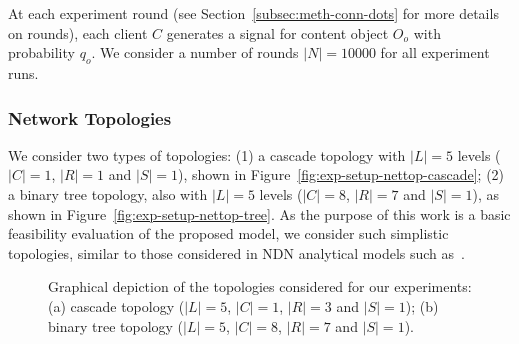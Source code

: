 At each experiment round (see Section~\ref{subsec:meth-conn-dots} for more details on 
rounds), each client $C$ generates a signal for content object $O_o$ with 
probability $q_{o}$. We consider a number of rounds 
$|N| = 10000$ for all experiment runs.\shortvertbreak

\subsubsection{Network Topologies}
\label{subsec:exp-setup-nettop}

We consider two types of topologies: (1) a cascade topology with $|L| = 5$ levels 
($|C| = 1$, $|R| = 1$ and $|S| = 1$), shown in Figure~\ref{fig:exp-setup-nettop-cascade}; (2) a binary 
tree topology, also with $|L| = 5$ levels ($|C| = 8$, $|R| = 7$ and $|S| = 1$), as 
shown in Figure~\ref{fig:exp-setup-nettop-tree}. As the purpose of this work is 
a basic feasibility evaluation of the proposed model, we consider such 
simplistic topologies, similar to those considered in NDN analytical models 
such as~\cite{6038471,Psaras:2011:MEC:2008780.2008789,Psaras2012,Chai2013}.\shortvertbreak

\begin{figure}[h!]
    \centering


    \cprotect\caption{Graphical depiction of the topologies considered for 
        our experiments: (a) cascade topology ($|L| = 5$, $|C| = 1$, $|R| = 3$ 
        and $|S| = 1$); (b) binary tree topology 
        ($|L| = 5$, $|C| = 8$, $|R| = 7$ and $|S| = 1$).}
    \label{fig:exp-setup-nettop}

\end{figure}

